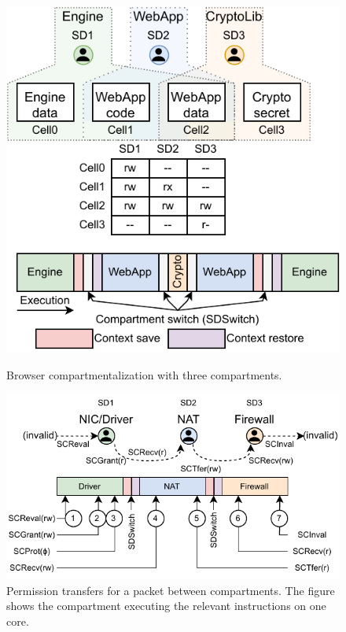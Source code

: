 \begin{figure}
  \centering
  \includegraphics[width=0.65\linewidth]{media/seccells/browser_webapp.pdf}
  \caption{Browser compartmentalization with three compartments.}
  \label{fig:seccells:browser_eg}
  \includegraphics[width=\linewidth]{media/seccells/dataflow_app.pdf}
  \caption[Permission transfers for a packet between \seccells compartments.]
          {Permission transfers for a packet between \seccells compartments. 
            The figure shows the compartment executing the relevant \seccells 
            instructions on one core.}
  \label{fig:seccells:dataflow_app}
\end{figure}

